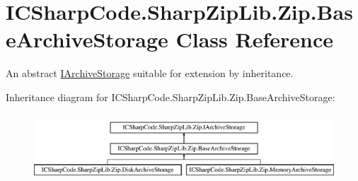 \hypertarget{class_i_c_sharp_code_1_1_sharp_zip_lib_1_1_zip_1_1_base_archive_storage}{}\section{I\+C\+Sharp\+Code.\+Sharp\+Zip\+Lib.\+Zip.\+Base\+Archive\+Storage Class Reference}
\label{class_i_c_sharp_code_1_1_sharp_zip_lib_1_1_zip_1_1_base_archive_storage}


An abstract \hyperlink{interface_i_c_sharp_code_1_1_sharp_zip_lib_1_1_zip_1_1_i_archive_storage}{I\+Archive\+Storage} suitable for extension by inheritance.  


Inheritance diagram for I\+C\+Sharp\+Code.\+Sharp\+Zip\+Lib.\+Zip.\+Base\+Archive\+Storage\+:\begin{figure}[H]
\begin{center}
\leavevmode
\includegraphics[height=2.530120cm]{class_i_c_sharp_code_1_1_sharp_zip_lib_1_1_zip_1_1_base_archive_storage}
\end{center}
\end{figure}
